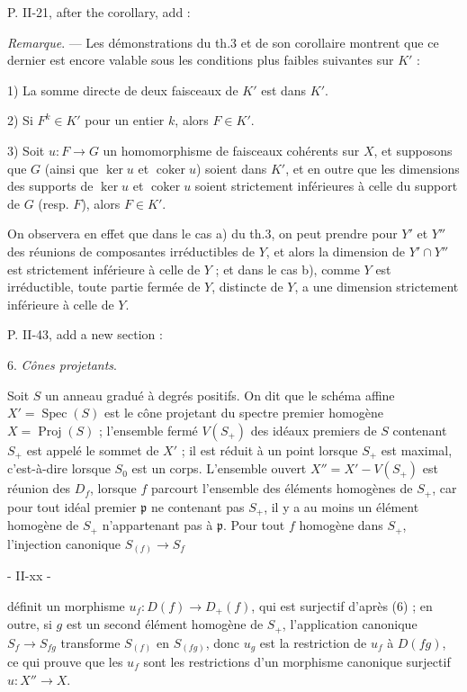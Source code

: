 P. II-21, after the corollary, add :

\emph{Remarque}. — Les démonstrations du th.3 et de son corollaire montrent que ce dernier est encore valable sous les conditions plus faibles suivantes sur $K'$ :

1) La somme directe de deux faisceaux de $K'$ est dans $K'$.

2) Si $F^k \in K'$ pour un entier $k$, alors $F \in K'$.

3) Soit $u : F \to G$ un homomorphisme de faisceaux cohérents sur $X$, et supposons que $G$ (ainsi que $\ker u$ et $\operatorname{coker} u$) soient dans $K'$, et en outre que les dimensions des supports de $\ker u$ et $\operatorname{coker} u$ soient strictement inférieures à celle du support de $G$ (resp. $F$), alors $F \in K'$. 

On observera en effet que dans le cas a) du th.3, on peut prendre pour $Y'$ et $Y''$ des réunions de composantes irréductibles de $Y$, et alors la dimension de $Y' \cap Y''$ est strictement inférieure à celle de $Y$ ; et dans le cas b), comme $Y$ est irréductible, toute partie fermée de $Y$, distincte de $Y$, a une dimension strictement inférieure à celle de $Y$.

P. II-43, add a new section :

6. \emph{C\^{o}nes projetants}.

Soit $S$ un anneau gradué à degrés positifs. On dit que le schéma affine $X' = \operatorname{Spec}(S)$ est le cône projetant du spectre premier homogène $X = \operatorname{Proj}(S)$ ; l'ensemble fermé $V(S_+)$ des idéaux premiers de $S$ contenant $S_+$ est appelé le sommet de $X'$ ; il est réduit à un point lorsque $S_+$ est maximal, c'est-à-dire lorsque $S_0$ est un corps. L'ensemble ouvert $X'' = X' - V(S_+)$ est réunion des $D_f$, lorsque $f$ parcourt l'ensemble des éléments homogènes de $S_+$, car pour tout idéal premier $\mathfrak{p}$ ne contenant pas $S_+$, il y a au moins un élément homogène de $S_+$ n'appartenant pas à $\mathfrak{p}$. Pour tout $f$ homogène dans $S_+$, l'injection canonique $S_{(f)} \to S_f$

\newpage


- II-xx -

définit un morphisme $u_f : D(f) \to D_+(f)$, qui est surjectif d'après (6) ; en outre, si $g$ est un second élément homogène de $S_+$, l'application canonique $S_f \to S_{fg}$ transforme $S_{(f)}$ en $S_{(fg)}$, donc $u_g$ est la restriction de $u_f$ à $D(fg)$, ce qui prouve que les $u_f$ sont les restrictions d'un morphisme canonique surjectif $u : X'' \to X$.

